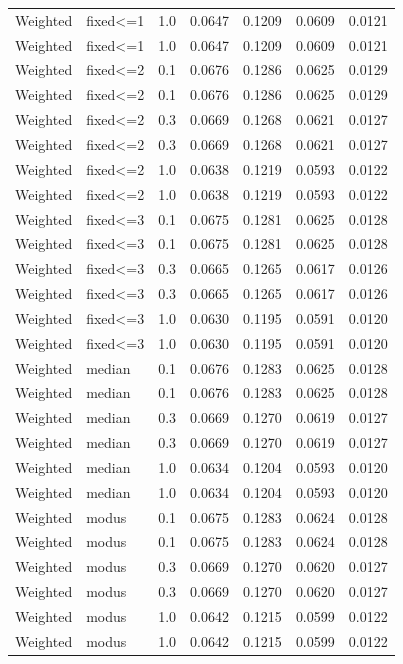 \begin{tabular}{llrrrrr}
Weighted &  fixed<=1 &    1.0 &   0.0647 &  0.1209 & 0.0609 & 0.0121 \\
Weighted &  fixed<=1 &    1.0 &   0.0647 &  0.1209 & 0.0609 & 0.0121 \\
Weighted &  fixed<=2 &    0.1 &   0.0676 &  0.1286 & 0.0625 & 0.0129 \\
Weighted &  fixed<=2 &    0.1 &   0.0676 &  0.1286 & 0.0625 & 0.0129 \\
Weighted &  fixed<=2 &    0.3 &   0.0669 &  0.1268 & 0.0621 & 0.0127 \\
Weighted &  fixed<=2 &    0.3 &   0.0669 &  0.1268 & 0.0621 & 0.0127 \\
Weighted &  fixed<=2 &    1.0 &   0.0638 &  0.1219 & 0.0593 & 0.0122 \\
Weighted &  fixed<=2 &    1.0 &   0.0638 &  0.1219 & 0.0593 & 0.0122 \\
Weighted &  fixed<=3 &    0.1 &   0.0675 &  0.1281 & 0.0625 & 0.0128 \\
Weighted &  fixed<=3 &    0.1 &   0.0675 &  0.1281 & 0.0625 & 0.0128 \\
Weighted &  fixed<=3 &    0.3 &   0.0665 &  0.1265 & 0.0617 & 0.0126 \\
Weighted &  fixed<=3 &    0.3 &   0.0665 &  0.1265 & 0.0617 & 0.0126 \\
Weighted &  fixed<=3 &    1.0 &   0.0630 &  0.1195 & 0.0591 & 0.0120 \\
Weighted &  fixed<=3 &    1.0 &   0.0630 &  0.1195 & 0.0591 & 0.0120 \\
Weighted &    median &    0.1 &   0.0676 &  0.1283 & 0.0625 & 0.0128 \\
Weighted &    median &    0.1 &   0.0676 &  0.1283 & 0.0625 & 0.0128 \\
Weighted &    median &    0.3 &   0.0669 &  0.1270 & 0.0619 & 0.0127 \\
Weighted &    median &    0.3 &   0.0669 &  0.1270 & 0.0619 & 0.0127 \\
Weighted &    median &    1.0 &   0.0634 &  0.1204 & 0.0593 & 0.0120 \\
Weighted &    median &    1.0 &   0.0634 &  0.1204 & 0.0593 & 0.0120 \\
Weighted &     modus &    0.1 &   0.0675 &  0.1283 & 0.0624 & 0.0128 \\
Weighted &     modus &    0.1 &   0.0675 &  0.1283 & 0.0624 & 0.0128 \\
Weighted &     modus &    0.3 &   0.0669 &  0.1270 & 0.0620 & 0.0127 \\
Weighted &     modus &    0.3 &   0.0669 &  0.1270 & 0.0620 & 0.0127 \\
Weighted &     modus &    1.0 &   0.0642 &  0.1215 & 0.0599 & 0.0122 \\
Weighted &     modus &    1.0 &   0.0642 &  0.1215 & 0.0599 & 0.0122 \\
\bottomrule
\end{tabular}
